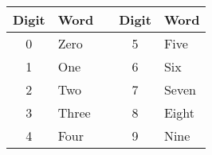 \documentclass{article}
\begin{document}
\begin{tabular}{@{}cllcl@{}}
    \toprule
    Digit & Word && Digit & Word \\
    \midrule
    0 & Zero  && 5 & Five \\
    1 & One   && 6 & Six \\
    2 & Two   && 7 & Seven \\
    3 & Three && 8 & Eight \\
    4 & Four  && 9 & Nine \\
    \bottomrule
\end{tabular}
\end{document}
